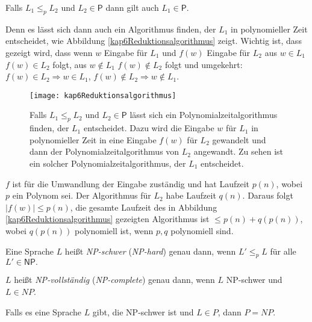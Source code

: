 \begin{Anm}
  \hspace{\parindent}Falls $L_1 \le_p L_2$ und $L_2 \in \mathsf{P}$ dann gilt auch $L_1 \in \mathsf{P}$.
\end{Anm}

Denn es lässt sich dann auch ein Algorithmus finden, der $L_1$ in polynomieller Zeit entscheidet, wie Abbildung \vref{kap6Reduktionsalgorithmus} zeigt. Wichtig ist, dass gezeigt wird, dass wenn $w$ Eingabe für $L_1$ und $f(w)$ Eingabe für $L_2$ aus $w \in L_1$ $f(w) \in L_2$ folgt, aus $w \notin L_1$ $f(w) \notin L_2$ folgt und umgekehrt: $f(w) \in L_2 \Rightarrow w \in L_1$, $f(w) \notin L_2 \Rightarrow w \notin L_1$.

\begin{figure}[htb]
  \centering
  \texttt{[image: kap6Reduktionsalgorithmus]}
  \caption{Falls $L_1 \le_p L_2$ und $L_2 \in \mathsf{P}$ lässt sich ein Polynomialzeitalgorithmus finden, der $L_1$ entscheidet. Dazu wird die Eingabe $w$ für $L_1$ in polynomieller Zeit in eine Eingabe $f(w)$ für $L_2$ gewandelt und dann der Polynomialzeitalgorithmus von $L_2$ angewandt. Zu sehen ist ein solcher Polynomialzeitalgorithmus, der $L_1$ entscheidet.}
  \label{kap6Reduktionsalgorithmus}
\end{figure}

$f$ ist für die Umwandlung der Eingabe zuständig und hat Laufzeit $p(n)$, wobei $p$ ein Polynom sei. Der Algorithmus für $L_2$ habe Laufzeit $q(n)$. Daraus folgt $|f(w)| \le p(n)$, die gesamte Laufzeit des in Abbildung \vref{kap6Reduktionsalgorithmus} gezeigten Algorithmus ist $\le p(n) + q(p(n))$, wobei $q(p(n))$ polynomiell ist, wenn $p, q$ polynomiell sind.

\begin{Def}
  \hspace{\parindent}Eine Sprache $L$ heißt \textit{\textsf{NP}-schwer} (\textit{\textsf{NP}-hard}) genau dann, wenn $L' \le_p L$ für alle $L' \in \mathsf{NP.}$
\end{Def}

\begin{Def}
  \hspace{\parindent}$L$ heißt \textit{\textsf{NP}-vollständig} (\textit{\textsf{NP}-complete}) genau dann, wenn $L$ \textsf{NP}-schwer und $L \in NP$.
\end{Def}

\begin{Anm}
  \hspace{\parindent}Falls es eine Sprache $L$ gibt, die \textsf{NP}-schwer ist und $L \in P$, dann $P = NP$.
\end{Anm}


